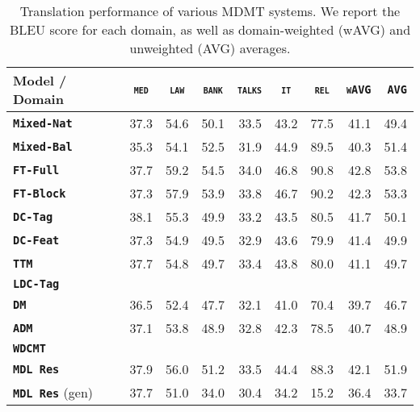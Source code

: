 \documentclass[11pt]{article}
\newcommand{\fyTodo}[1]{\Todo[FY:]{\textcolor{orange}{#1}}}
\newcommand{\domain}[1]{\texttt{\textsc{#1}}}
\newcommand{\system}[1]{\texttt{\textbf{#1}}}
\begin{document}
\fyTodo{Importance of sharing and unsharing}

\begin{table}
  \centering
  \fyTodo{Fix column size}
  \begin{tabular}{|p{3cm}|*{8}{r|}} \hline
    Model / Domain & \multicolumn{1}{c|}{\domain{med}} & \multicolumn{1}{c|}{\domain{law}} & \multicolumn{1}{c|}{\domain{bank}} & \multicolumn{1}{c|}{\domain{talks}} & \multicolumn{1}{c|}{\domain{it}} & \multicolumn{1}{c|}{\domain{rel}} & \domain{wAVG} & \domain{AVG}\\ \hline
    \system{Mixed-Nat}  & 37.3 & 54.6 & 50.1 & 33.5 & 43.2 & 77.5  & 41.1&49.4\\
    \system{Mixed-Bal}   &  35.3 & 54.1 & 52.5 & 31.9 & 44.9 & 89.5 & 40.3&51.4\\
    \system{FT-Full}       & 37.7 & 59.2 & 54.5 & 34.0 & 46.8 & 90.8   & 42.8&53.8\\
   \system{FT-Block}     & 37.3 & 57.9 & 53.9 & 33.8 & 46.7 & 90.2    & 42.3&53.3\\ \hline


    \system{DC-Tag}   & 38.1 & 55.3 & 49.9   & 33.2 & 43.5 & 80.5 &41.7 & 50.1\\
    \system{DC-Feat}  & 37.3   & 54.9 & 49.5   & 32.9 & 43.6 & 79.9 &41.4 & 49.9\\
    \system{TTM}        & 37.7 & 54.8 & 49.7 & 33.4 & 43.8 & 80.0 &41.1 & 49.7\\
    \system{LDC-Tag} &&&&& &&&\\
    \system{DM}             & 36.5 & 52.4  & 47.7& 32.1 & 41.0 & 70.4 & 39.7 & 46.7 \\
    \system{ADM}           & 37.1 & 53.8  & 48.9 &32.8 & 42.3 & 78.5 & 40.7 & 48.9 \\
    \system{WDCMT}      & & & & & & & & \\
    \system{MDL Res}     & 37.9 & 56.0  & 51.2   & 33.5   &  44.4  & 88.3 & 42.1 & 51.9\\
    \system{MDL Res} (gen)           & 37.7 & 51.0 & 34.0 & 30.4 & 34.2 & 15.2 & 36.4 & 33.7\\
     \hline
  \end{tabular}
  \caption{Translation performance of various MDMT systems. We report the BLEU score for each domain, as well as domain-weighted (wAVG) and unweighted (AVG) averages.}
  \label{tab:performance}
\end{table}
\fyTodo{Fill the table with all results, including a comparison with *RNNs* for wcmd}
\end{document}
